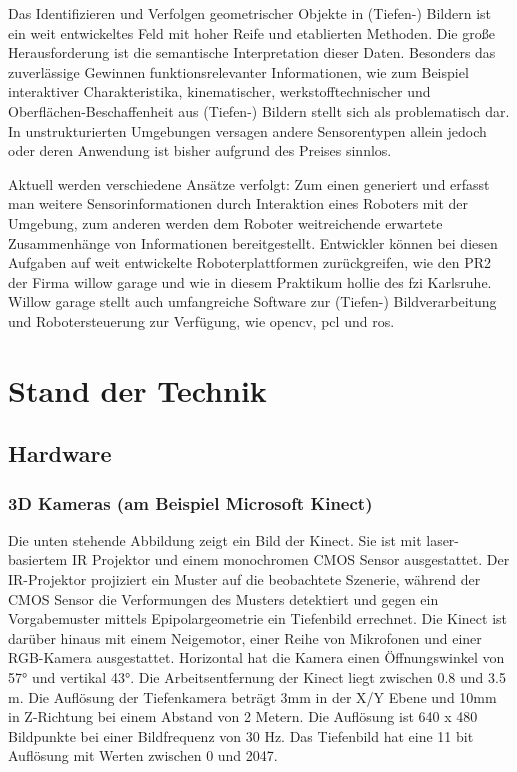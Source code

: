 Das Identifizieren und Verfolgen geometrischer Objekte in (Tiefen-) Bildern ist ein weit entwickeltes Feld mit hoher Reife und etablierten Methoden.
 Die große Herausforderung ist die semantische Interpretation dieser Daten. Besonders das zuverlässige Gewinnen funktionsrelevanter Informationen,
 wie zum Beispiel interaktiver Charakteristika, kinematischer, werkstofftechnischer und  Oberflächen-Beschaffenheit aus (Tiefen-) Bildern stellt sich
 als problematisch dar. In unstrukturierten Umgebungen versagen andere Sensorentypen allein jedoch oder deren Anwendung ist bisher aufgrund des Preises sinnlos.
 
Aktuell werden verschiedene Ansätze verfolgt: Zum einen generiert und erfasst man weitere Sensorinformationen durch Interaktion eines Roboters mit der Umgebung,
 zum anderen werden dem Roboter weitreichende erwartete Zusammenhänge von Informationen bereitgestellt. Entwickler können bei diesen Aufgaben auf weit entwickelte Roboterplattformen
 zurückgreifen, wie den PR2 der Firma willow garage und wie in diesem Praktikum
 \gls{hollie} des \gls{fzi} Karlsruhe. Willow garage stellt auch umfangreiche
 Software zur (Tiefen-) Bildverarbeitung und Robotersteuerung zur Verfügung,
 wie \gls{opencv}, \gls{pcl} und \gls{ros}.

\section{Stand der Technik}
\label{stand_der_technik_sec}
\authorsection{\editordummy}

\subsection{Hardware}
\subsubsection{3D Kameras (am Beispiel Microsoft Kinect)}
Die unten stehende Abbildung zeigt ein Bild der Kinect. Sie ist mit laser-basiertem IR Projektor und einem monochromen CMOS Sensor ausgestattet. Der IR-Projektor projiziert ein Muster auf die beobachtete Szenerie, während der CMOS Sensor die Verformungen des Musters detektiert und gegen ein Vorgabemuster mittels Epipolargeometrie ein Tiefenbild errechnet. Die Kinect ist darüber hinaus mit einem Neigemotor, einer Reihe von Mikrofonen und einer RGB-Kamera ausgestattet. Horizontal hat die Kamera einen Öffnungswinkel von 57° und vertikal 43°. Die Arbeitsentfernung der Kinect liegt zwischen 0.8 und 3.5 m. Die Auflösung der Tiefenkamera beträgt 3mm in der X/Y Ebene und 10mm in Z-Richtung bei einem Abstand von 2 Metern. Die Auflösung ist 640 x 480 Bildpunkte bei einer Bildfrequenz von 30 Hz. Das Tiefenbild hat eine 11 bit Auflösung mit Werten zwischen 0 und 2047.

